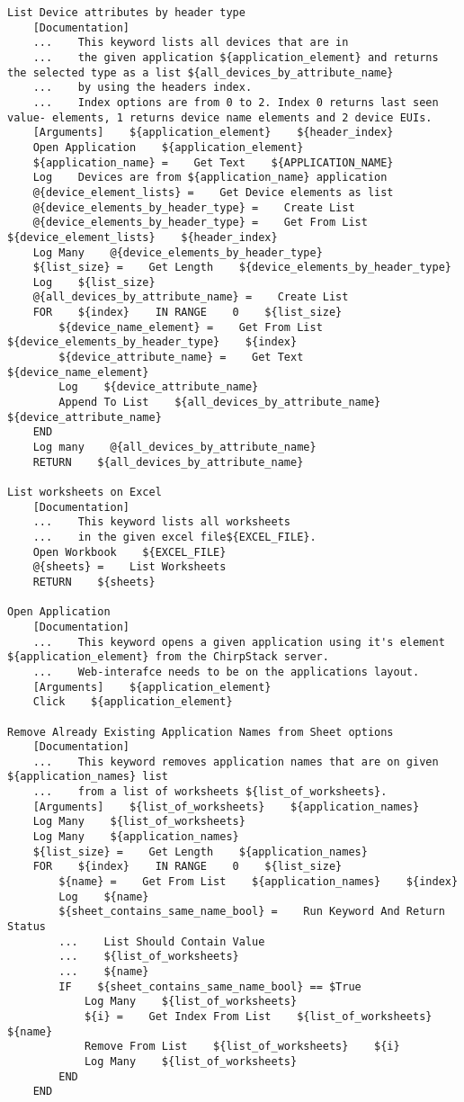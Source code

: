 \begin{verbatim}
List Device attributes by header type
    [Documentation]
    ...    This keyword lists all devices that are in
    ...    the given application ${application_element} and returns the selected type as a list ${all_devices_by_attribute_name}
    ...    by using the headers index.
    ...    Index options are from 0 to 2. Index 0 returns last seen value- elements, 1 returns device name elements and 2 device EUIs.
    [Arguments]    ${application_element}    ${header_index}
    Open Application    ${application_element}
    ${application_name} =    Get Text    ${APPLICATION_NAME}
    Log    Devices are from ${application_name} application
    @{device_element_lists} =    Get Device elements as list
    @{device_elements_by_header_type} =    Create List
    @{device_elements_by_header_type} =    Get From List    ${device_element_lists}    ${header_index}
    Log Many    @{device_elements_by_header_type}
    ${list_size} =    Get Length    ${device_elements_by_header_type}
    Log    ${list_size}
    @{all_devices_by_attribute_name} =    Create List
    FOR    ${index}    IN RANGE    0    ${list_size}
        ${device_name_element} =    Get From List    ${device_elements_by_header_type}    ${index}
        ${device_attribute_name} =    Get Text    ${device_name_element}
        Log    ${device_attribute_name}
        Append To List    ${all_devices_by_attribute_name}    ${device_attribute_name}
    END
    Log many    @{all_devices_by_attribute_name}
    RETURN    ${all_devices_by_attribute_name}

List worksheets on Excel
    [Documentation]
    ...    This keyword lists all worksheets
    ...    in the given excel file${EXCEL_FILE}.
    Open Workbook    ${EXCEL_FILE}
    @{sheets} =    List Worksheets
    RETURN    ${sheets}

Open Application
    [Documentation]
    ...    This keyword opens a given application using it's element ${application_element} from the ChirpStack server.
    ...    Web-interafce needs to be on the applications layout.
    [Arguments]    ${application_element}
    Click    ${application_element}

Remove Already Existing Application Names from Sheet options
    [Documentation]
    ...    This keyword removes application names that are on given ${application_names} list
    ...    from a list of worksheets ${list_of_worksheets}.
    [Arguments]    ${list_of_worksheets}    ${application_names}
    Log Many    ${list_of_worksheets}
    Log Many    ${application_names}
    ${list_size} =    Get Length    ${application_names}
    FOR    ${index}    IN RANGE    0    ${list_size}
        ${name} =    Get From List    ${application_names}    ${index}
        Log    ${name}
        ${sheet_contains_same_name_bool} =    Run Keyword And Return Status
        ...    List Should Contain Value
        ...    ${list_of_worksheets}
        ...    ${name}
        IF    ${sheet_contains_same_name_bool} == $True
            Log Many    ${list_of_worksheets}
            ${i} =    Get Index From List    ${list_of_worksheets}    ${name}
            Remove From List    ${list_of_worksheets}    ${i}
            Log Many    ${list_of_worksheets}
        END
    END


\end{verbatim}

